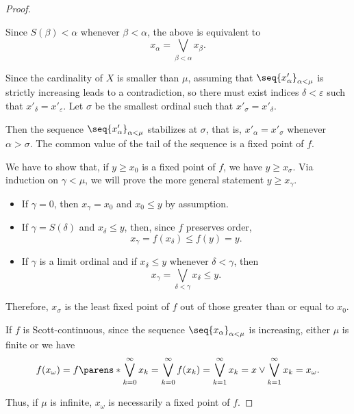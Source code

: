 \begin{proof}
\begin{itemize}
    Since \( S(\beta) < \alpha \) whenever \( \beta < \alpha \), the above is equivalent to
    \begin{equation*}
      x_\alpha = \bigvee_{\beta < \alpha} x_\beta.
    \end{equation*}
  \end{itemize}

   Since the cardinality of \( X \) is smaller than \( \mu \), assuming that \( \seq{ x'_\alpha }_{\alpha < \mu} \) is strictly increasing leads to a contradiction, so there must exist indices \( \delta < \varepsilon \) such that \( x'_\delta = x'_\varepsilon \). Let \( \sigma \) be the smallest ordinal such that \( x'_\sigma = x'_\delta \).

  Then the sequence \( \seq{ x'_\alpha }_{\alpha < \mu} \) stabilizes at \( \sigma \), that is, \( x'_\alpha = x'_\sigma \) whenever \( \alpha > \sigma \). The common value of the tail of the sequence is a fixed point of \( f \).

   We have to show that, if \( y \geq x_0 \) is a fixed point of \( f \), we have \( y \geq x_\sigma \). Via induction on \( \gamma < \mu \), we will prove the more general statement \( y \geq x_\gamma \).
  \begin{itemize}
    \item If \( \gamma = 0 \), then \( x_\gamma = x_0 \) and \( x_0 \leq y \) by assumption.
    \item If \( \gamma = S(\delta) \) and  \( x_\delta \leq y \), then, since \( f \) preserves order,
    \begin{equation*}
      x_\gamma = f(x_\delta) \leq f(y) = y.
    \end{equation*}

    \item If \( \gamma \) is a limit ordinal and if \( x_\delta \leq y \) whenever \( \delta < \gamma \), then
    \begin{equation*}
      x_\gamma = \bigvee_{\delta < \gamma} x_\delta \leq y.
    \end{equation*}
  \end{itemize}

  Therefore, \( x_\sigma \) is the least fixed point of \( f \) out of those greater than or equal to \( x_0 \).

   If \( f \) is Scott-continuous, since the sequence \( \seq{ x_\alpha }_{\alpha < \mu} \) is increasing, either \( \mu \) is finite or we have
  \begin{equation*}
    f(x_\omega)
    =
    f\parens*{ \bigvee_{k=0}^\infty x_k }
    =
    \bigvee_{k=0}^\infty f(x_k)
    =
    \bigvee_{k=1}^\infty x_k
    =
    x \vee \bigvee_{k=1}^\infty x_k
    =
    x_\omega.
  \end{equation*}

  Thus, if \( \mu \) is infinite, \( x_\omega \) is necessarily a fixed point of \( f \).
\end{proof}

